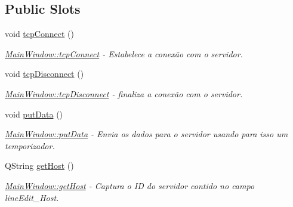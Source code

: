 \subsection*{Public Slots}
\begin{DoxyCompactItemize}
\item 
\mbox{\label{class_main_window_ac5b669957c442b6eb68573dacfce33e1}} 
void \mbox{\hyperlink{class_main_window_ac5b669957c442b6eb68573dacfce33e1}{tcp\+Connect}} ()
\begin{DoxyCompactList}\small\item\em \mbox{\hyperlink{class_main_window_ac5b669957c442b6eb68573dacfce33e1}{Main\+Window\+::tcp\+Connect}} -\/ Estabelece a conexão com o servidor. \end{DoxyCompactList}\item 
\mbox{\label{class_main_window_a4d22c4c7afc7ba0a2fa4c70515c85dda}} 
void \mbox{\hyperlink{class_main_window_a4d22c4c7afc7ba0a2fa4c70515c85dda}{tcp\+Disconnect}} ()
\begin{DoxyCompactList}\small\item\em \mbox{\hyperlink{class_main_window_a4d22c4c7afc7ba0a2fa4c70515c85dda}{Main\+Window\+::tcp\+Disconnect}} -\/ finaliza a conexão com o servidor. \end{DoxyCompactList}\item 
\mbox{\label{class_main_window_afdfeb13ec363b0eb8ecacaf0aa13b605}} 
void \mbox{\hyperlink{class_main_window_afdfeb13ec363b0eb8ecacaf0aa13b605}{put\+Data}} ()
\begin{DoxyCompactList}\small\item\em \mbox{\hyperlink{class_main_window_afdfeb13ec363b0eb8ecacaf0aa13b605}{Main\+Window\+::put\+Data}} -\/ Envia os dados para o servidor usando para isso um temporizador. \end{DoxyCompactList}\item 
Q\+String \mbox{\hyperlink{class_main_window_a57a1f8959ed5f0eee73281829b2331fa}{get\+Host}} ()
\begin{DoxyCompactList}\small\item\em \mbox{\hyperlink{class_main_window_a57a1f8959ed5f0eee73281829b2331fa}{Main\+Window\+::get\+Host}} -\/ Captura o ID do servidor contido no campo line\+Edit\+\_\+\+Host. \end{DoxyCompactList}\item 
\mbox{\label{class_main_window_a79fdaf1fd769f0584f50da34e415b3de}} 

\end{DoxyCompactItemize}
